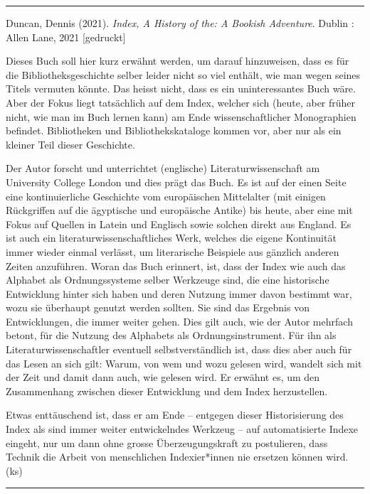 \documentclass[a4paper,
fontsize=11pt,
oneside,
numbers=noperiodatend,
parskip=half-,
bibliography=totoc,
final
]{scrartcl}
\begin{document}
\begin{center}\rule{0.5\linewidth}{0.5pt}\end{center}

Duncan, Dennis (2021). \emph{Index, A History of the: A Bookish
Adventure}. Dublin : Allen Lane, 2021 {[}gedruckt{]}

Dieses Buch soll hier kurz erwähnt werden, um darauf hinzuweisen, dass
es für die Bibliotheksgeschichte selber leider nicht so viel enthält,
wie man wegen seines Titels vermuten könnte. Das heisst nicht, dass es
ein uninteressantes Buch wäre. Aber der Fokus liegt tatsächlich auf dem
Index, welcher sich (heute, aber früher nicht, wie man im Buch lernen
kann) am Ende wissenschaftlicher Monographien befindet. Bibliotheken und
Bibliothekskataloge kommen vor, aber nur als ein kleiner Teil dieser
Geschichte.

Der Autor forscht und unterrichtet (englische) Literaturwissenschaft am
University College London und dies prägt das Buch. Es ist auf der einen
Seite eine kontinuierliche Geschichte vom europäischen Mittelalter (mit
einigen Rückgriffen auf die ägyptische und europäische Antike) bis
heute, aber eine mit Fokus auf Quellen in Latein und Englisch sowie
solchen direkt aus England. Es ist auch ein literaturwissenschaftliches
Werk, welches die eigene Kontinuität immer wieder einmal verlässt, um
literarische Beispiele aus gänzlich anderen Zeiten anzuführen. Woran das
Buch erinnert, ist, dass der Index wie auch das Alphabet als
Ordnungssysteme selber Werkzeuge sind, die eine historische Entwicklung
hinter sich haben und deren Nutzung immer davon bestimmt war, wozu sie
überhaupt genutzt werden sollten. Sie sind das Ergebnis von
Entwicklungen, die immer weiter gehen. Dies gilt auch, wie der Autor
mehrfach betont, für die Nutzung des Alphabets als Ordnungsinstrument.
Für ihn als Literaturwissenschaftler eventuell selbstverständlich ist,
dass dies aber auch für das Lesen an sich gilt: Warum, von wem und wozu
gelesen wird, wandelt sich mit der Zeit und damit dann auch, wie gelesen
wird. Er erwähnt es, um den Zusammenhang zwischen dieser Entwicklung und
dem Index herzustellen.

Etwas enttäuschend ist, dass er am Ende -- entgegen dieser
Historisierung des Index als sind immer weiter entwickelndes Werkzeug --
auf automatisierte Indexe eingeht, nur um dann ohne grosse
Überzeugungskraft zu postulieren, dass Technik die Arbeit von
menschlichen Indexier*innen nie ersetzen können wird. (ks)

\begin{center}\rule{0.5\linewidth}{0.5pt}\end{center}
\end{document}
